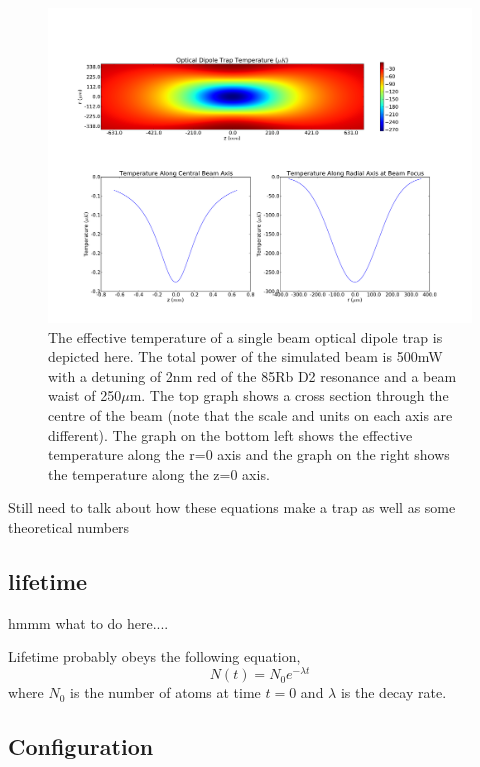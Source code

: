 \begin{figure}[h!]
\centering
\includegraphics[width=18cm]{figs/dipolepotential.pdf}
\caption{The effective temperature of a single beam optical dipole trap is depicted here. The total power of the simulated beam is 500mW with a detuning of 2nm red of the 85Rb D2 resonance and a beam waist of 250$\mu$m. The top graph shows a cross section through the centre of the beam (note that the scale and units on each axis are different). The graph on the bottom left shows the effective temperature along the r=0 axis and the graph on the right shows the temperature along the z=0 axis.}
\label{fig:dipolepotential}
\end{figure}

{\color{red} Still need to talk about how these equations make a trap as well as some theoretical numbers}

\subsection{lifetime}

{\color{red} hmmm what to do here....

Lifetime probably obeys the following equation,
\begin{equation}
N(t) = N_0 e^{-\lambda t}
\end{equation}
where $N_0$ is the number of atoms at time $t=0$ and $\lambda$ is the decay rate.
}


\subsection{Configuration}

